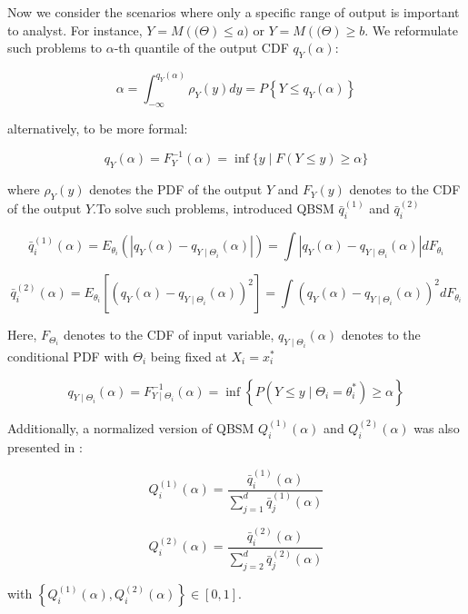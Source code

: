 Now we consider the scenarios where only a specific range of output is important to analyst. For instance, $Y = M(\boldsymbol(\Theta) \leq a )$ or $Y = M(\boldsymbol(\Theta) \geq b$. We reformulate such problems to $\alpha$-th quantile of the output CDF $q_Y(\alpha)$:


\begin{equation} \label{eq:11}
\alpha=\int_{-\infty}^{q_{Y}(\alpha)} \rho_{Y}(y) d y=P\left\{Y \leq q_{Y}(\alpha)\right\}
\end{equation}

\noindent
alternatively, to be more formal:

\begin{equation} \label{eq:12}
q_{Y}(\alpha)=F_{Y}^{-1}(\alpha)=\inf \{y \mid F(Y \leq y) \geq \alpha\}
\end{equation}

\noindent
where $\rho_Y(y)$ denotes the PDF of the output $Y$ and $F_Y(y)$ denotes to the CDF of the output $Y$.To solve such problems, \cite{kucherenko2019QuantileBasedGlobal} introduced QBSM $\bar{q}_{i}^{(1)}$ and $\bar{q}_{i}^{(2)}$

\begin{equation} \label{eq:13}
\bar{q}_{i}^{(1)}(\alpha)=E_{\theta_{i}}\left(\left|q_{Y}(\alpha)-q_{Y \mid \Theta_{i}}(\alpha)\right|\right)=\int\left|q_{Y}(\alpha)-q_{Y \mid \Theta_{i}}(\alpha)\right| d F_{\theta_{i}}
\end{equation}

\begin{equation} \label{eq:14}
\bar{q}_{i}^{(2)}(\alpha)=E_{\theta_{i}}\left[\left(q_{Y}(\alpha)-q_{Y \mid \Theta_{i}}(\alpha)\right)^{2}\right]=\int\left(q_{Y}(\alpha)-q_{Y \mid \Theta_{i}}(\alpha)\right)^{2} d F_{\theta_{i}}
\end{equation}

\noindent
Here,  $F_{\Theta_i}$ denotes to the CDF of input variable, $q_{Y \mid \Theta_{i}}({\alpha})$ denotes to the conditional PDF with $\Theta_{i}$ being fixed at $X_{i}=x_{i}^{\mbox{*}}$ \citep{song2021QuantileSensitivityMeasures}

\begin{equation}\label{eq:15}
q_{Y \mid \Theta_{i}}(\alpha)=F_{Y \mid \Theta_{i}}^{-1}(\alpha)=\inf \left\{P\left(Y \leq y \mid \Theta_{i}=\theta_{i}^{*}\right) \geq \alpha\right\}
\end{equation}


\noindent
Additionally, a normalized version of QBSM $Q_{i}^{(1)}(\alpha)$ and $Q_{i}^{(2)}(\alpha)$ was also presented in \cite{kucherenko2019QuantileBasedGlobal}:

\begin{equation}\label{eq:16}
Q_{i}^{(1)}(\alpha)=\frac{\bar{q}_{i}^{(1)}(\alpha)}{\sum_{j=1}^{d} \bar{q}_{j}^{(1)}(\alpha)}
\end{equation}

\begin{equation}\label{eq:17}
Q_{i}^{(2)}(\alpha)=\frac{\bar{q}_{i}^{(2)}(\alpha)}{\sum_{j=2}^{d} \bar{q}_{j}^{(2)}(\alpha)}
\end{equation}

\noindent
with $\left\{Q_{i}^{(1)}(\alpha), Q_{i}^{(2)}(\alpha)\right\} \in[0,1]$.




